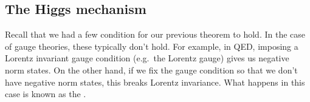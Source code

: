 \documentclass[a4paper]{article}
\begin{document}
%
%
%

\subsection{The Higgs mechanism}
Recall that we had a few condition for our previous theorem to hold. In the case of gauge theories, these typically don't hold. For example, in QED, imposing a Lorentz invariant gauge condition (e.g.\ the Lorentz gauge) gives us negative norm states. On the other hand, if we fix the gauge condition so that we don't have negative norm states, this breaks Lorentz invariance. What happens in this case is known as the .
\end{document}
